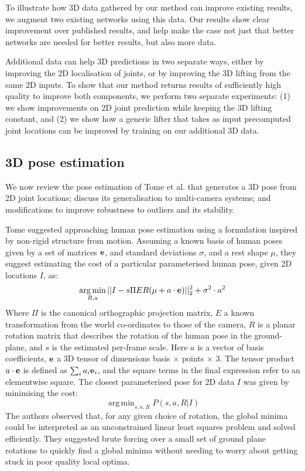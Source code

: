 \documentclass[10pt,twocolumn,letterpaper]{article}
\DeclareMathOperator*{\argmin}{arg\,min}
\begin{document}
To illustrate how 3D data gathered by our method can improve existing results,
we augment two existing networks using this data. Our results show clear
improvement over published results, and help make the case not just that better
networks are needed for better results, but also more data.

Additional data can help 3D predictions in two separate ways, either
by improving the 2D localisation of joints, or by improving the 3D
lifting from the same 2D inputs. To show that our method returns
results of sufficiently high quality to improve both components, we
perform two separate experiments: (1) we show improvements on 2D joint
prediction while keeping the 3D lifting constant, and (2) we show how a
generic lifter that takes as input precomputed joint locations can be improved
by training on our additional 3D data.
\subsection{3D pose estimation}
 \label{sec:3D-pose-estimation}
 We now review the pose estimation of Tome et al.\cite{tome2017lifting} that
 generates a 3D pose from 2D joint locations; discuss its generalisation to
 multi-camera systems; and modifications to improve robustness to outliers and
 its stability.

 Tome \etal suggested approaching human pose estimation using a formulation
 inspired by non-rigid structure from motion. Assuming a known basis of human
 poses given by a set of matrices ${\bf e}${, and standard deviations $\sigma$,}  and a rest shape $\mu$, they suggest
 estimating the cost of a particular parameterised human pose, given 2D {locations} $I$, as:
 \begin{equation}\label{eq:get3D}
\argmin_{R,a}  ||I -s\Pi E R (\mu + a\cdot {\bf e} )||_2^2 + \sigma^2 \cdot a^2
 \end{equation}
 Where $\Pi$ is the canonical orthographic projection matrix, $E$ a known
 transformation from the world co-ordinates to those of the camera, $R$
 is a planar rotation matrix that describes the rotation of the human pose in the
 ground-plane, and $s$ is the estimated per-frame scale.
 Here $a$ is a vector of basis coefficients, ${\bf e}$ a 3D tensor of dimensions basis
 $\times$ points $\times$ 3.
 The tensor product $a\cdot {\bf e}$ is defined as $\sum_i a_i
 {\bf e}_i$, and the square terms in the final expression refer to an
 elementwise square. 
 The closest parameterised pose for 2D data $I$ was {given by minimising the  cost}:
 \begin{equation}
  \argmin_{s,a,R} P(s,a,R|I)
 \end{equation}
 The authors observed that, for any given choice of rotation, the global minima
 could be interpreted as an unconstrained linear least squares problem and
 solved efficiently. They suggested brute forcing over a small set of ground
 plane rotations to quickly find a global minima without needing to worry about
 getting stuck in poor quality local optima.
\end{document}
